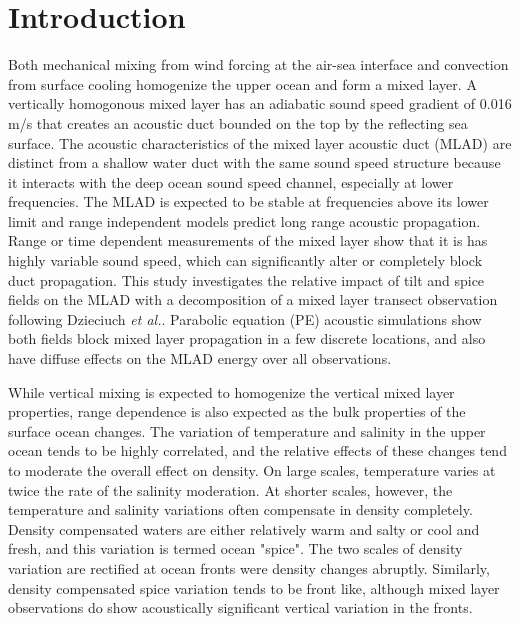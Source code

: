 \documentclass[preprint,NumberedRefs]{JASA}
\begin{document}
\section{\label{sec:intro} Introduction}
Both mechanical mixing from wind forcing at the air-sea interface and convection from surface cooling homogenize the upper ocean and form a mixed layer\citep{cole2010seasonal}. A vertically homogonous mixed layer has an adiabatic sound speed gradient of 0.016 m/s that creates an acoustic duct bounded on the top by the reflecting sea surface. The acoustic characteristics of the mixed layer acoustic duct (MLAD) are distinct from a shallow water duct with the same sound speed structure because it interacts with the deep ocean sound speed channel\citep{porter93}, especially at lower frequencies. The MLAD is expected to be stable at frequencies above its lower limit\citep{Urick1982Prop} and range independent models predict long range acoustic propagation. Range or time dependent measurements of the mixed layer show that it is has highly variable sound speed\citep{cole2010seasonal,rudnick1999compensation,klymak2015}, which can significantly alter or completely block duct propagation\citep{colosi2020observations,colosi21}. This study investigates the relative impact of tilt and spice fields on the MLAD with a decomposition of a mixed layer transect observation following Dzieciuch \emph{et al.}\citep{dzieciuch2004}. Parabolic equation (PE) acoustic simulations\citep{collins93} show both fields block mixed layer propagation in a few discrete locations, and also have diffuse effects on the MLAD energy over all observations.

While vertical mixing is expected to homogenize the vertical mixed layer properties, range dependence is also expected as the bulk properties of the surface ocean changes\citep{ferrari2000}. The variation of temperature and salinity in the upper ocean tends to be highly correlated, and the relative effects of these changes tend to moderate the overall effect on density. On large scales, temperature varies at twice the rate of the salinity moderation. At shorter scales, however, the temperature and salinity variations often compensate in density completely. Density compensated waters are either relatively warm and salty or cool and fresh, and this variation is termed ocean "spice"\citep{munk1981evolution}. The two scales of density variation are rectified at ocean fronts were density changes abruptly. Similarly, density compensated spice variation tends to be front like, although mixed layer observations do show acoustically significant vertical variation in the fronts.
\end{document}
